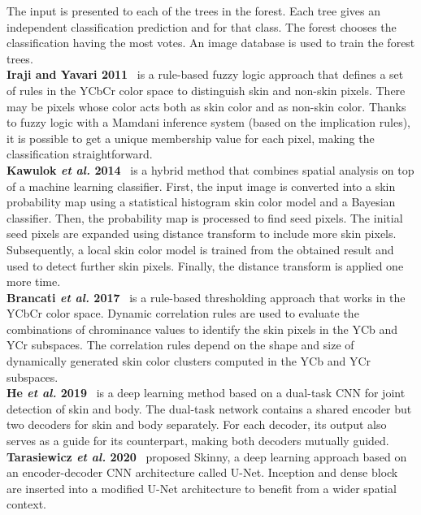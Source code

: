 The input is presented to each of the trees in the forest.
Each tree gives an independent classification prediction and  for that class.
The forest chooses the classification having the most votes. An image database is used to train the forest trees.\\
\textbf{Iraji and Yavari 2011}~\cite{iraji2011skin} is a rule-based fuzzy logic approach that defines a set of rules in the YCbCr color space to distinguish skin and non-skin pixels.
There may be pixels whose color acts both as skin color and as non-skin color.
Thanks to fuzzy logic with a Mamdani inference system (based on the implication rules), it is possible to get a unique membership value for each pixel, making the classification straightforward.\\
\textbf{Kawulok \textit{et al.} 2014}~\cite{Kawulok2014EURASIP} is a hybrid method that combines spatial analysis on top of a machine learning classifier.
First, the input image is converted into a skin probability map using a statistical histogram skin color model and a Bayesian classifier.
Then, the probability map is processed to find seed pixels.
The initial seed pixels are expanded using distance transform to include more skin pixels.
Subsequently, a local skin color model is trained from the obtained result and used to detect further skin pixels.
Finally, the distance transform is applied one more time.\\
\textbf{Brancati \textit{et al.} 2017}~\cite{brancati2017human} is a rule-based thresholding approach that works in the YCbCr color space.
Dynamic correlation rules are used to evaluate the combinations of chrominance values to identify the skin pixels in the YCb and YCr subspaces.
The correlation rules depend on the shape and size of dynamically generated skin color clusters computed in the YCb and YCr subspaces.\\
\textbf{He \textit{et al.} 2019}~\cite{he2019semi} is a deep learning method based on a dual-task CNN for joint detection of skin and body.
The dual-task network contains a shared encoder but two decoders for skin and body separately.
For each decoder, its output also serves as a guide for its counterpart, making both decoders mutually guided.\\
\textbf{Tarasiewicz \textit{et al.} 2020}~\cite{tarasiewicz2020skinny} proposed Skinny, a deep learning approach based on an encoder-decoder CNN architecture called U-Net.
Inception and dense block are inserted into a modified U-Net architecture to benefit from a wider spatial context.\\

